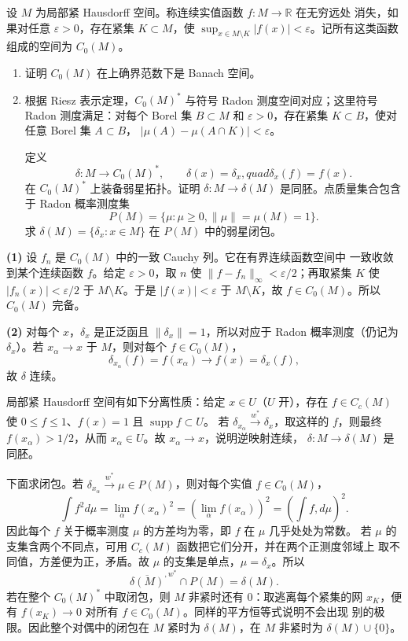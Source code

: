 \begin{problem}
设 $M$ 为局部紧 Hausdorff 空间。称连续实值函数 $f:M\to\mathbb R$ 在无穷远处
消失，如果对任意 $\varepsilon>0$，存在紧集 $K\subset M$，使
$\sup_{x\in M\setminus K}|f(x)|<\varepsilon$。记所有这类函数组成的空间为
$C_0(M)$。
\begin{enumerate}
 \item 证明 $C_0(M)$ 在上确界范数下是 Banach 空间。
 \item 根据 Riesz 表示定理，$C_0(M)^*$ 与符号 Radon 测度空间对应；这里符号
 Radon 测度满足：对每个 Borel 集 $B\subset M$ 和 $\varepsilon>0$，存在紧集
 $K\subset B$，使对任意 Borel 集 $A\subset B$，
 $|\mu(A)-\mu(A\cap K)|<\varepsilon$。

 定义
 \[
  \delta:M\to C_0(M)^*,\qquad \delta(x)=\delta_x,quad
  \delta_x(f)=f(x).
 \]
 在 $C_0(M)^*$ 上装备弱星拓扑。证明
 $\delta:M\to\delta(M)$ 是同胚。点质量集合包含于 Radon 概率测度集
 \[
  P(M)=\{\mu:\mu\ge0, \|\mu\|=\mu(M)=1\}.
 \]
 求 $\delta(M)=\{\delta_x:x\in M\}$ 在 $P(M)$ 中的弱星闭包。
\end{enumerate}
\end{problem}

\textbf{(1)} 设 $f_n$ 是 $C_0(M)$ 中的一致 Cauchy 列。它在有界连续函数空间中
一致收敛到某个连续函数 $f$。给定 $\varepsilon>0$，取 $n$ 使
$\|f-f_n\|_\infty<\varepsilon/2$；再取紧集 $K$ 使
$|f_n(x)|<\varepsilon/2$ 于 $M\setminus K$。于是 $|f(x)|<\varepsilon$ 于
$M\setminus K$，故 $f\in C_0(M)$。所以 $C_0(M)$ 完备。

\textbf{(2)} 对每个 $x$，$\delta_x$ 是正泛函且 $\|\delta_x\|=1$，所以对应于
Radon 概率测度（仍记为 $\delta_x$）。若 $x_\alpha\to x$ 于 $M$，则对每个
$f\in C_0(M)$，
\[
 \delta_{x_\alpha}(f)=f(x_\alpha)\to f(x)=\delta_x(f),
\]
故 $\delta$ 连续。

局部紧 Hausdorff 空间有如下分离性质：给定 $x\in U$（$U$ 开），存在
$f\in C_c(M)$ 使 $0\le f\le1$、$f(x)=1$ 且 $\operatorname{supp}f\subset U$。
若 $\delta_{x_\alpha}\overset{w^*}\to\delta_x$，取这样的 $f$，则最终
$f(x_\alpha)>1/2$，从而 $x_\alpha\in U$。故 $x_\alpha\to x$，说明逆映射连续，
$\delta:M\to\delta(M)$ 是同胚。

下面求闭包。若 $\delta_{x_\alpha}\overset{w^*}\to\mu\in P(M)$，则对每个实值
$f\in C_0(M)$，
\[
 \int f^2d\mu=\lim_\alpha f(x_\alpha)^2
 =\left(\lim_\alpha f(x_\alpha)\right)^2
 =\left(\int f,d\mu\right)^2.
\]
因此每个 $f$ 关于概率测度 $\mu$ 的方差均为零，即 $f$ 在 $\mu$ 几乎处处为常数。
若 $\mu$ 的支集含两个不同点，可用 $C_c(M)$ 函数把它们分开，并在两个正测度邻域上
取不同值，方差便为正，矛盾。故 $\mu$ 的支集是单点，$\mu=\delta_x$。所以
\[
 \overline{\delta(M)}^{,w^*}\cap P(M)=\delta(M).
\]
若在整个 $C_0(M)^*$ 中取闭包，则 $M$ 非紧时还有 $0$：取逃离每个紧集的网
$x_K$，便有 $f(x_K)\to0$ 对所有 $f\in C_0(M)$。同样的平方恒等式说明不会出现
别的极限。因此整个对偶中的闭包在 $M$ 紧时为 $\delta(M)$，在 $M$ 非紧时为
$\delta(M)\cup\{0\}$。

